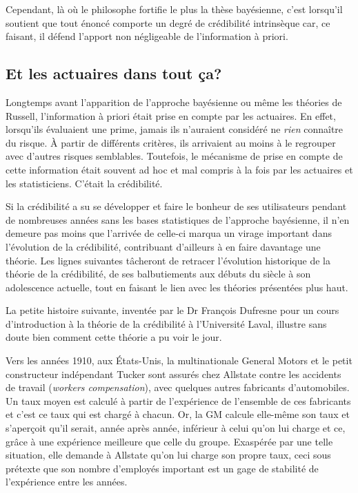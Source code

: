 Cependant, là où le philosophe fortifie le plus la thèse bayésienne,
c'est lorsqu'il soutient que tout énoncé comporte un degré de
crédibilité intrinsèque car, ce faisant, il défend l'apport non
négligeable de l'information à priori.

\subsection{Et les actuaires dans tout ça?}
\label{sec:introduction-historique:actuaires}

Longtemps avant l'apparition de l'approche bayésienne ou même les
théories de Russell, l'information à priori était prise en compte par
les actuaires. En effet, lorsqu'ils évaluaient une prime, jamais ils
n'auraient considéré ne \emph{rien} connaître du risque. À partir de
différents critères, ils arrivaient au moins à le regrouper avec
d'autres risques semblables. Toutefois, le mécanisme de prise en
compte de cette information était souvent ad hoc et mal compris à
la fois par les actuaires et les statisticiens. C'était la
crédibilité.

Si la crédibilité a su se développer et faire le bonheur de ses
utilisateurs pendant de nombreuses années sans les bases statistiques
de l'approche bayésienne, il n'en demeure pas moins que l'arrivée de
celle-ci marqua un virage important dans l'évolution de la
crédibilité, contribuant d'ailleurs à en faire davantage une théorie.
Les lignes suivantes tâcheront de retracer l'évolution historique de
la théorie de la crédibilité, de ses balbutiements aux débuts du
siècle à son adolescence actuelle, tout en faisant le lien avec les
théories présentées plus haut.

La petite histoire suivante, inventée par le Dr François Dufresne pour
un cours d'introduction à la théorie de la crédibilité à l'Université
Laval, illustre sans doute bien comment cette théorie a pu voir le
jour.

Vers les années 1910, aux États-Unis, la multinationale General Motors
et le petit constructeur indépendant Tucker sont assurés chez Allstate
contre les accidents de travail (\emph{workers compensation}), avec
quelques autres fabricants d'automobiles. Un taux moyen est calculé à
partir de l'expérience de l'ensemble de ces fabricants et c'est ce
taux qui est chargé à chacun. Or, la GM calcule elle-même son taux et
s'aperçoit qu'il serait, année après année, inférieur à celui qu'on
lui charge et ce, grâce à une expérience meilleure que celle du
groupe. Exaspérée par une telle situation, elle demande à Allstate
qu'on lui charge son propre taux, ceci sous prétexte que son nombre
d'employés important est un gage de stabilité de l'expérience entre
les années.

